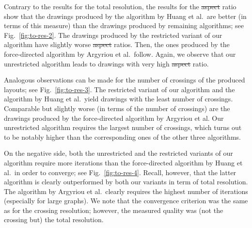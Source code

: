 \documentclass{comjnl}
\providecommand{\DIFaddtex}[1]{{\protect\color{blue}\uwave{#1}}} %
\providecommand{\DIFdeltex}[1]{{\protect\color{red}\sout{#1}}}                      %
\providecommand{\DIFaddbegin}{} %
\providecommand{\DIFaddend}{} %
\providecommand{\DIFdelbegin}{} %
\providecommand{\DIFdelend}{} %
\providecommand{\DIFadd}[1]{\texorpdfstring{\DIFaddtex{#1}}{#1}} %
\providecommand{\DIFdel}[1]{\texorpdfstring{\DIFdeltex{#1}}{}} %
\newcommand{\DIFscaledelfig}{0.5}
\newlength{\DIFdelgraphicswidth} %
\newlength{\DIFdelgraphicsheight} %
\newcommand{\DIFaddincludegraphics}[2][]{{\color{blue}\fbox{\DIFOincludegraphics[#1]{#2}}}} %
\newcommand{\DIFdelincludegraphics}[2][]{%
\sbox{\DIFdelgraphicsbox}{\DIFOincludegraphics[#1]{#2}}%
\settoboxwidth{\DIFdelgraphicswidth}{\DIFdelgraphicsbox} %
\settoboxtotalheight{\DIFdelgraphicsheight}{\DIFdelgraphicsbox} %
\scalebox{\DIFscaledelfig}{%
\parbox[b]{\DIFdelgraphicswidth}{\usebox{\DIFdelgraphicsbox}\\[-\baselineskip] \rule{\DIFdelgraphicswidth}{0em}}\llap{\resizebox{\DIFdelgraphicswidth}{\DIFdelgraphicsheight}{%
\setlength{\unitlength}{\DIFdelgraphicswidth}%
\begin{picture}(1,1)%
\thicklines\linethickness{2pt} %
{\color[rgb]{1,0,0}\put(0,0){\framebox(1,1){}}}%
{\color[rgb]{1,0,0}\put(0,0){\line( 1,1){1}}}%
{\color[rgb]{1,0,0}\put(0,1){\line(1,-1){1}}}%
\end{picture}%
}\hspace*{3pt}}} %
} %
\DeclareRobustCommand{\DIFaddbegin}{\DIFOaddbegin \let\includegraphics\DIFaddincludegraphics} %
\DeclareRobustCommand{\DIFaddend}{\DIFOaddend \let\includegraphics\DIFOincludegraphics} %
\DeclareRobustCommand{\DIFdelbegin}{\DIFOdelbegin \let\includegraphics\DIFdelincludegraphics} %
\DeclareRobustCommand{\DIFdelend}{\DIFOaddend \let\includegraphics\DIFOincludegraphics} %
\begin{document}
Contrary to the results for the total resolution, the results for the \DIFdelbegin \DIFdel{aspect }\DIFdelend \DIFaddbegin \DIFadd{edge-length }\DIFaddend ratio show that the drawings produced by the algorithm by Huang et al.\ are better (in terms of this measure) than the drawings produced by remaining algorithms; see Fig.~\ref{fig:to-res-2}. 
The drawings produced by the restricted variant of our algorithm have slightly worse \DIFdelbegin \DIFdel{aspect }\DIFdelend \DIFaddbegin \DIFadd{edge-length }\DIFaddend ratios. Then, the ones produced by the force-directed algorithm by Argyriou et al.\ follow. Again, we observe that our unrestricted algorithm leads to drawings with very high \DIFdelbegin \DIFdel{aspect }\DIFdelend \DIFaddbegin \DIFadd{edge-length }\DIFaddend ratio.

Analogous observations can be made for the number of crossings of the produced layouts; see Fig.~\ref{fig:to-res-3}. The restricted variant of our algorithm and the algorithm by Huang et al.\ yield drawings with the least number of crossings. Comparable but slightly worse (in terms of the number of crossings) are the drawings produced by the force-directed algorithm by Argyriou et al. Our unrestricted algorithm requires the largest number of crossings, which turns out to be notably higher than the corresponding ones of the other three algorithms.

On the negative side, both the unrestricted and the restricted variants of our algorithm require more iterations than the force-directed algorithm by Huang et al.\ in order to converge; see Fig.~\ref{fig:to-res-4}. Recall, however, that the latter algorithm is clearly outperformed by both our variants in term of total resolution. The algorithm by Argyriou et al.\ clearly requires the highest number of iterations (especially for large graphs). We note that the convergence criterion was the same as for the crossing resolution; however, the measured quality was (not the crossing but) the total resolution.
\end{document}

